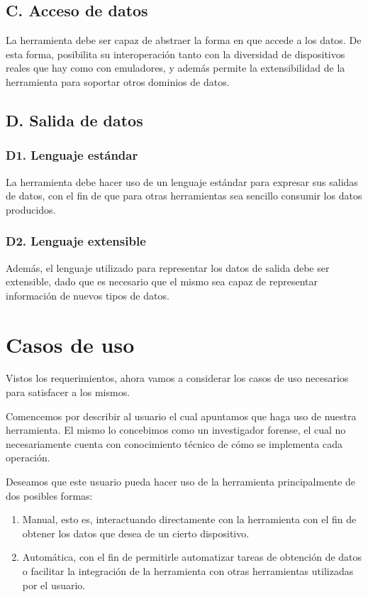 \subsection*{C. Acceso de datos}
\label{reqC}
La herramienta debe ser capaz de abstraer la forma en que accede a los datos. De esta forma, posibilita su interoperación tanto con la diversidad de dispositivos reales que hay como con emuladores, y además permite la extensibilidad de la herramienta para soportar otros dominios de datos.

\subsection*{D. Salida de datos}
\subsubsection*{D1. Lenguaje estándar}
\label{reqD1}
La herramienta debe hacer uso de un lenguaje estándar para expresar sus salidas de datos, con el fin de que para otras herramientas sea sencillo consumir los datos producidos.

\subsubsection*{D2. Lenguaje extensible}
\label{reqD2}
Además, el lenguaje utilizado para representar los datos de salida debe ser extensible, dado que es necesario que el mismo sea capaz de representar información de nuevos tipos de datos.

\section{Casos de uso}
Vistos los requerimientos, ahora vamos a considerar los casos de uso necesarios para satisfacer a los mismos.

Comencemos por describir al usuario el cual apuntamos que haga uso de nuestra herramienta. El mismo lo concebimos como un investigador forense, el cual no necesariamente cuenta con conocimiento técnico de cómo se implementa cada operación.

Deseamos que este usuario pueda hacer uso de la herramienta principalmente de dos posibles formas:

\begin{enumerate}[topsep=0pt, parsep=0pt, partopsep=0pt]
\item Manual, esto es, interactuando directamente con la herramienta con el fin de obtener los datos que desea de un cierto dispositivo.
\item Automática, con el fin de permitirle automatizar tareas de obtención de datos o facilitar la integración de la herramienta con otras herramientas utilizadas por el usuario.
\end{enumerate}

